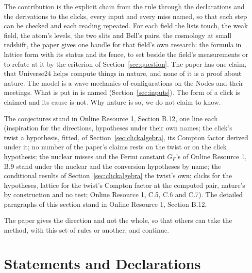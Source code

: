 \documentclass[pdflatex,sn-mathphys-num]{sn-jnl}
\theoremstyle{thmstyleone}
\theoremstyle{thmstyletwo}
\begin{document}
The contribution is the explicit chain from the rule through the declarations and the derivations to the clicks, every input and every miss named, so that each step can be checked and each reading repeated. For each field the lists touch, the weak field, the atom's levels, the two slits and Bell's pairs, the cosmology at small redshift, the paper gives one handle for that field's own research: the formula in lattice form with its status and its fence, to set beside the field's measurements or to refute at it by the criterion of Section~\ref{sec:question}. The paper has one claim, that Universe24 helps compute things in nature, and none of it is a proof about nature. The model is a wave mechanics of configurations on the Nodes and their meetings. What is put in is named (Section~\ref{sec:inputs}). The form of a click is claimed and its cause is not. Why nature is so, we do not claim to know.

The conjectures stand in Online Resource 1, Section B.12, one line each (inspiration for the directions, hypotheses under their own names; the click's twist a hypothesis, fitted, of Section~\ref{sec:clickalgebra}, its Compton factor derived under it; no number of the paper's claims rests on the twist or on the click hypothesis; the nuclear misses and the Fermi constant $G_F$'s of Online Resource 1, B.9 stand under the nuclear and the conversion hypotheses by name; the conditional results of Section~\ref{sec:clickalgebra} the twist's own; clicks for the hypotheses, lattice for the twist's Compton factor at the computed pair, nature's by construction and no test; Online Resource 1, C.5, C.6 and C.7). The detailed paragraphs of this section stand in Online Resource 1, Section B.12.

The paper gives the direction and not the whole, so that others can take the method, with this set of rules or another, and continue.

\vspace{-6pt}
\section*{Statements and Declarations}
\end{document}

